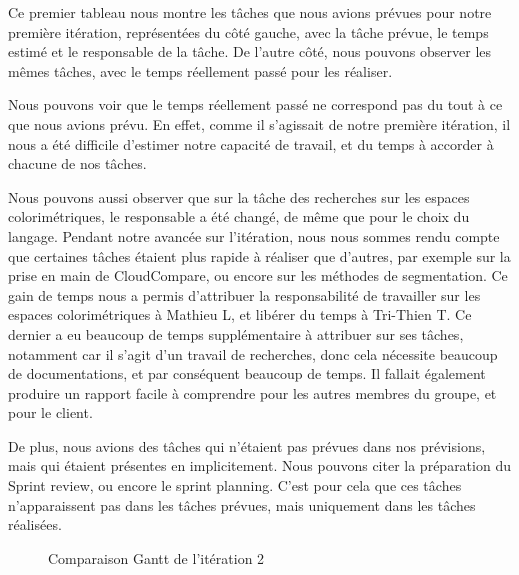 \documentclass[12pt,titlepage,french]{article}
\begin{document}
Ce premier tableau nous montre les tâches que nous avions prévues pour notre première itération, représentées du côté gauche, avec la tâche prévue, le temps estimé et le responsable de la tâche. De l'autre côté, nous pouvons observer les mêmes tâches, avec le temps réellement passé pour les réaliser. \newline

Nous pouvons voir que le temps réellement passé ne correspond pas du tout à ce que nous avions prévu. En effet, comme il s'agissait de notre première itération, il nous a été difficile d'estimer notre capacité de travail, et du temps à accorder à chacune de nos tâches. \newline

Nous pouvons aussi observer que sur la tâche des recherches sur les espaces colorimétriques, le responsable a été changé, de même que pour le choix du langage. Pendant notre avancée sur l'itération, nous nous sommes rendu compte que certaines tâches étaient plus rapide à réaliser que d'autres, par exemple sur la prise en main de CloudCompare, ou encore sur les méthodes de segmentation. Ce gain de temps nous a permis d'attribuer la responsabilité de travailler sur les espaces colorimétriques à Mathieu L, et libérer du temps à Tri-Thien T. Ce dernier a eu beaucoup de temps supplémentaire à attribuer sur ses tâches, notamment car il s'agit d'un travail de recherches, donc cela nécessite beaucoup de documentations, et par conséquent beaucoup de temps. Il fallait également produire un rapport facile à comprendre pour les autres membres du groupe, et pour le client. \newline

De plus, nous avions des tâches qui n'étaient pas prévues dans nos prévisions, mais qui étaient présentes en implicitement. Nous pouvons citer la préparation du Sprint review, ou encore le sprint planning. C'est pour cela que ces tâches n'apparaissent pas dans les tâches prévues, mais uniquement dans les tâches réalisées.

\begin{figure}[H]
    \caption{\label{} Comparaison Gantt de l'itération 2}
\end{figure}
\end{document}
